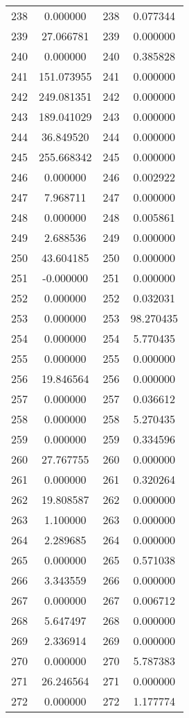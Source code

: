\documentclass[12pt]{article}
\begin{document}
\begin{longtable}{@{}cccc@{}}
238 & 0.000000 & 238 & 0.077344 \\
239 & 27.066781 & 239 & 0.000000 \\
240 & 0.000000 & 240 & 0.385828 \\
241 & 151.073955 & 241 & 0.000000 \\
242 & 249.081351 & 242 & 0.000000 \\
243 & 189.041029 & 243 & 0.000000 \\
244 & 36.849520 & 244 & 0.000000 \\
245 & 255.668342 & 245 & 0.000000 \\
246 & 0.000000 & 246 & 0.002922 \\
247 & 7.968711 & 247 & 0.000000 \\
248 & 0.000000 & 248 & 0.005861 \\
249 & 2.688536 & 249 & 0.000000 \\
250 & 43.604185 & 250 & 0.000000 \\
251 & -0.000000 & 251 & 0.000000 \\
252 & 0.000000 & 252 & 0.032031 \\
253 & 0.000000 & 253 & 98.270435 \\
254 & 0.000000 & 254 & 5.770435 \\
255 & 0.000000 & 255 & 0.000000 \\
256 & 19.846564 & 256 & 0.000000 \\
257 & 0.000000 & 257 & 0.036612 \\
258 & 0.000000 & 258 & 5.270435 \\
259 & 0.000000 & 259 & 0.334596 \\
260 & 27.767755 & 260 & 0.000000 \\
261 & 0.000000 & 261 & 0.320264 \\
262 & 19.808587 & 262 & 0.000000 \\
263 & 1.100000 & 263 & 0.000000 \\
264 & 2.289685 & 264 & 0.000000 \\
265 & 0.000000 & 265 & 0.571038 \\
266 & 3.343559 & 266 & 0.000000 \\
267 & 0.000000 & 267 & 0.006712 \\
268 & 5.647497 & 268 & 0.000000 \\
269 & 2.336914 & 269 & 0.000000 \\
270 & 0.000000 & 270 & 5.787383 \\
271 & 26.246564 & 271 & 0.000000 \\
272 & 0.000000 & 272 & 1.177774 \\

\end{longtable}
\end{document}
